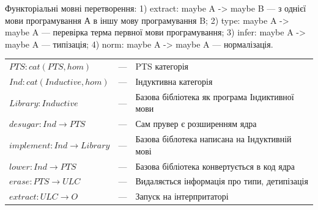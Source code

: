 Функторіальні мовні перетворення: 1) extract: maybe A -> maybe B --- з однієї
мови програмування А в іншу мову програмування B; 2) type: maybe A -> maybe A
--- перевірка терма первної мови програмування; 3) infer: maybe A -> maybe A
--- типізація; 4) norm: maybe A -> maybe A --- нормалізація.


\begin{center}
\end{center}

\begin{fullwidth}
\hspace{0cm}
\begin{tabular}{lll}
  $PTS: cat(PTS,hom)$ &---& PTS категорія \\
  $Ind: cat(Inductive,hom)$ &---& Індуктивна категорія \\
  $Library: Inductive$ &---& Базова бібліотека як програма Індиктивної мови\\
  $desugar: Ind \rightarrow PTS$ &---& Сам прувер є розширенням ядра \\
  $implement: Ind \rightarrow Library$ &---& Базова біблотека написана на Індуктивній мові \\
  $lower: Ind \rightarrow PTS$ &---& Базова бібліотека конвертується в код ядра \\
  $erase: PTS \rightarrow ULC$ &---& Видаляється інформація про типи, детипізація \\
  $extract: ULC \rightarrow O$ &---& Запуск на інтерпритаторі \\
\end{tabular}
\end{fullwidth}

